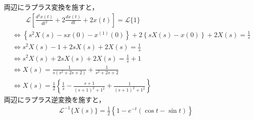 \documentclass[a4paper,12pt]{article}
\begin{document}
\begin{tcolorbox}[title={8. \( \ddot{x}(t) + 2\dot{x}(t) + 2x(t) = 1\)を解け。ただし、\(x(0)=0,\dot{x}(0)=1\)とする。
    }]
    \quad 両辺にラプラス変換を施すと，
    \begin{align*}
        &\qquad \mathcal{L}\left[ \frac{d^2 x(t)}{dt^2} + 2 \frac{dx(t)}{dt} + 2x(t) \right] = \mathcal{L}\{1\} \\
        &\Leftrightarrow \left\{s^2 X(s) - sx(0) - x^{(1)}(0) \right\} 
        + 2 \left\{ sX(s) - x(0) \right\} + 2X(s) 
        = \frac{1}{s} \\
        &\Leftrightarrow s^2 X(s) - 1 + 2sX(s) + 2X(s) = \frac{1}{s} \\
        &\Leftrightarrow s^2 X(s) + 2sX(s) + 2X(s) = \frac{1}{s} + 1 \\
        &\Leftrightarrow X(s) = \frac{1}{s(s^2 + 2s + 2)} + \frac{1}{s^2 + 2s + 2} \\
        &\Leftrightarrow X(s) = \frac{1}{2} \left\{ \frac{1}{s} - \frac{s+1}{(s+1)^2 + 1^2} + \frac{1}{(s+1)^2 + 1^2} \right\}
    \end{align*}
    \qquad 両辺にラプラス逆変換を施すと，
        \vspace{-3mm}
    \begin{align*}
        \mathcal{L}^{-1}\{X(s)\} = \frac{1}{2} \left\{ 1 - e^{-t}(\cos t - \sin t) \right\}
    \end{align*}
    
    
    
    \vspace{2mm}
\end{tcolorbox}
\end{document}
